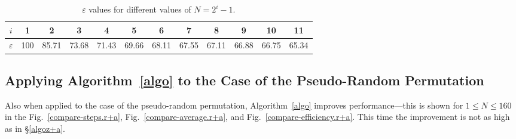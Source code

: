 \documentclass{elsart}
\begin{document}
\begin{table}
\begin{center}
\begin{tabular}{|c|ccccccccccc|} \hline 
$i$&{1}&{2}&{3}&{4}&{5}&{6}&{7}&{8}&{9}&{10}&{11}\\ \hline
$\varepsilon$&100&85.71&73.68&71.43&69.66&68.11&67.55&67.11&66.88&66.75&65.34\\
\hline
\end{tabular}
\end{center}
\caption{$\varepsilon$ values for different values of $N=2^i-1$.}
\label{pots}
\end{table}



\subsection{Applying Algorithm~\ref{algo} to the Case of the Pseudo-Random Permutation}
Also when applied to the case of the pseudo-random permutation, 
Algorithm~\ref{algo} improves performance---this is shown for $1\leq N\leq160$
in the Fig.~\ref{compare-steps.r+a}, Fig.~\ref{compare-average.r+a}, and Fig.~\ref{compare-efficiency.r+a}.
This time the improvement is not as high as in \S\ref{algoz+a}.
\end{document}
